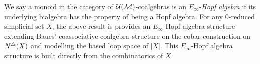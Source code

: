 We say a monoid in the category of $\mathcal{U(\mathcal{M})}$-coalgebras is an $E_{\infty}$-\textit{Hopf algebra} if its underlying bialgebra has the property of being a Hopf algebra. For any $0$-reduced simplicial set $X$, the above result is provides an $E_{\infty}$-Hopf algebra structure extending Baues' coassociative coalgebra structure on the cobar construction on $N^{\triangle}(X)$ and modelling the based loop space of $|X|$. This $E_{\infty}$-Hopf algebra structure is built directly from the combinatorics of $X$. 




